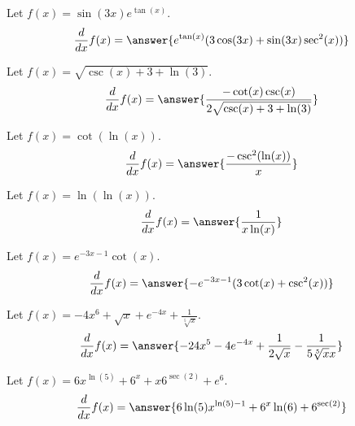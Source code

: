 \documentclass{ximera}
\begin{document}
\begin{shuffle}
\begin{exercise}
Let $f(x)=\sin (3 x) e^{\tan (x)}$.
\[
\ddx f(x) = \answer{e^{\tan (x)} (3 \cos (3 x)+\sin (3 x) \sec ^2(x))}
\]
\end{exercise}

\begin{exercise}
Let $f(x)=\sqrt{\csc (x)+3+\ln (3)}$.
\[
\ddx f(x) = \answer{\frac{-\cot (x) \csc (x)}{2 \sqrt{\csc (x)+3+\ln (3)}}}
\]
\end{exercise}

\begin{exercise}
Let $f(x)=\cot (\ln (x))$.
\[
\ddx f(x) = \answer{\frac{-\csc ^2(\ln (x))}{x}}
\]
\end{exercise}

\begin{exercise}
Let $f(x)=\ln (\ln (x))$.
\[
\ddx f(x) = \answer{\frac{1}{x \ln (x)}}
\]
\end{exercise}

\begin{exercise}
Let $f(x)=e^{-3 x-1} \cot (x)$.
\[
\ddx f(x) = \answer{-e^{-3 x-1} (3 \cot (x)+\csc ^2(x))}
\]
\end{exercise}

\begin{exercise}
Let $f(x)=-4 x^6+\sqrt{x}+e^{-4 x}+\frac{1}{\sqrt[5]{x}}$.
\[
\ddx f(x) = \answer{-24 x^5-4 e^{-4 x}+\frac{1}{2 \sqrt{x}}-\frac{1}{5 \sqrt[5]{x} x}}
\]
\end{exercise}


\begin{exercise}
Let $f(x)=6 x^{\ln (5)}+6^x+x 6^{\sec (2)}+e^6$.
\[
\ddx f(x) = \answer{6 \ln (5) x^{\ln (5)-1}+6^x \ln (6)+6^{\sec (2)}}
\]
\end{exercise}




\end{shuffle}
\end{document}
